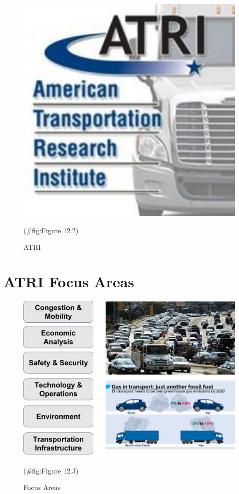 \documentclass[
]{book}
\begin{document}
\begin{figure}

{\centering \includegraphics{./Images/Research organizations/ATRI} 

}

\caption{ATRI}(\#fig:Figure 12.2)
\end{figure}

\hypertarget{organization-focusareas}{%
\section{ATRI Focus Areas}\label{organization-focusareas}}

\begin{figure}

{\centering \includegraphics{./Images/Research organizations/Focus Areas} 

}

\caption{Focus Areas}(\#fig:Figure 12.3)
\end{figure}
\end{document}
